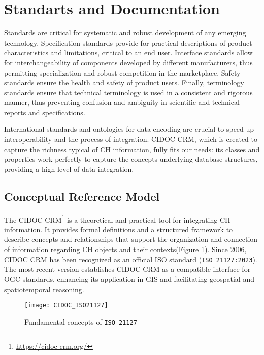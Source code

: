 \section{Standarts and Documentation} 
\label{sub:standart}

Standards are critical for systematic and robust development of any emerging technology. 
Specification standards provide for practical descriptions of product characteristics and limitations, 
critical to an end user. Interface standards allow for interchangeability of components developed by 
different manufacturers, thus permitting specialization and robust competition in the marketplace. 
Safety standards ensure the health and safety of product users. Finally, terminology standards ensure that 
technical terminology is used in a consistent and rigorous manner, thus preventing confusion and 
ambiguity in scientific and technical reports and specifications.
~\cite{hale2014handbook}

International standards and ontologies for data encoding are crucial
to speed up interoperability and the process of integration. \gls{CIDOC-CRM}, which is created to capture the richness typical of CH
information, fully fits our needs: its classes and properties
work perfectly to capture the concepts underlying database structures, providing a high level of data integration.
~\cite{eide2008encoding}



\subsection{ Conceptual Reference Model} 
\label{sec:cidoc}


The \gls{CIDOC-CRM}\footnote{\url{https://cidoc-crm.org/}} is a theoretical and practical tool for integrating \gls{CH} information. It provides formal definitions and a structured framework to describe concepts and relationships that support the organization and connection of information regarding \gls{CH} objects and their contexts(Figure \ref{fig:cidoc}).
Since 2006, CIDOC CRM has been recognized as an official ISO standard (\texttt{ISO 21127:2023}). The most recent version establishes \gls{CIDOC-CRM} as a compatible interface for \gls{OGC} standards, enhancing its application in \gls{GIS} and facilitating geospatial and spatiotemporal reasoning.


\begin{figure}[h!]
    \centering
    \texttt{[image: CIDOC\_ISO21127]}
    \caption{Fundamental concepts of \texttt{ISO 21127} ~\cite{doerr2007cidoc}}
    \label{fig:cidoc}
\end{figure}
\FloatBarrier

